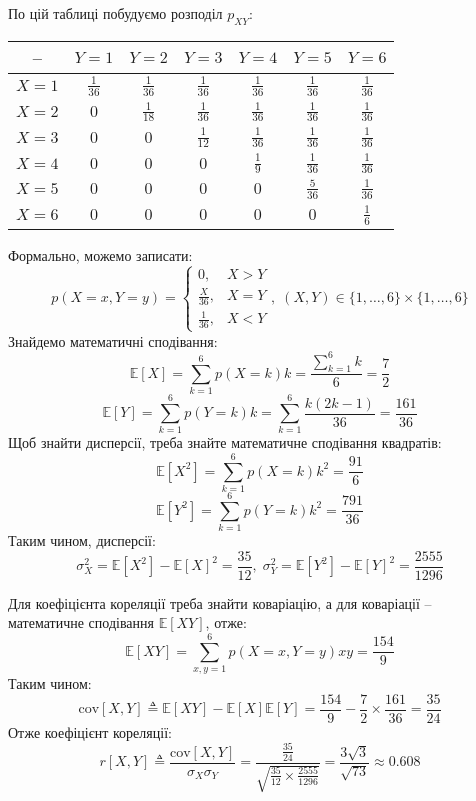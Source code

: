 \documentclass[14pt]{extarticle}
\begin{document}
По цій таблиці побудуємо розподіл $p_{XY}$:
\begin{center}
\begin{tabular}{ |c|c|c|c|c|c|c| } 
 \hline
 -- & $Y=1$ & $Y=2$ & $Y=3$ & $Y=4$ & $Y=5$ & $Y=6$ \\ 
 \hline
 $X=1$ & $\frac{1}{36}$ & $\frac{1}{36}$ & $\frac{1}{36}$ & $\frac{1}{36}$ & $\frac{1}{36}$ & $\frac{1}{36}$ \\ 
 \hline
 $X=2$ & $0$ & $\frac{1}{18}$ & $\frac{1}{36}$ & $\frac{1}{36}$ & $\frac{1}{36}$ & $\frac{1}{36}$ \\ 
 \hline
 $X=3$ & $0$ & $0$ & $\frac{1}{12}$ & $\frac{1}{36}$ & $\frac{1}{36}$ & $\frac{1}{36}$ \\
 \hline
 $X=4$ & $0$ & $0$ & $0$ & $\frac{1}{9}$ & $\frac{1}{36}$ & $\frac{1}{36}$ \\
 \hline
 $X=5$ & $0$ & $0$ & $0$ & $0$ & $\frac{5}{36}$ & $\frac{1}{36}$ \\
 \hline
 $X=6$ & $0$ & $0$ & $0$ & $0$ & $0$ & $\frac{1}{6}$ \\
 \hline
\end{tabular}
\end{center}
Формально, можемо записати:
\[
p(X=x,Y=y) = \begin{cases}
    0, & X > Y \\
    \frac{X}{36}, & X = Y \\ 
    \frac{1}{36}, & X < Y
\end{cases}, \; (X,Y) \in \{1,\dots,6\} \times \{1,\dots,6\}
\]
Знайдемо математичні сподівання:
\[
\mathbb{E}[X] = \sum_{k=1}^6 p(X=k)k = \frac{\sum_{k=1}^6 k}{6} = \frac{7}{2}
\]
\[
\mathbb{E}[Y] = \sum_{k=1}^6 p(Y=k)k = \sum_{k=1}^6 \frac{k(2k-1)}{36} = \frac{161}{36}
\]
Щоб знайти дисперсії, треба знайте математичне сподівання квадратів:
\[
\mathbb{E}[X^2] = \sum_{k=1}^6 p(X=k)k^2 = \frac{91}{6}
\]
\[
\mathbb{E}[Y^2] = \sum_{k=1}^6 p(Y=k)k^2 = \frac{791}{36}
\]
Таким чином, дисперсії:
\[
\sigma_X^2 = \mathbb{E}[X^2] - \mathbb{E}[X]^2 = \frac{35}{12}, \; \sigma_Y^2 = \mathbb{E}[Y^2] - \mathbb{E}[Y]^2 = \frac{2555}{1296}
\]

Для коефіцієнта кореляції треба знайти коваріацію, а для коваріації -- математичне сподівання $\mathbb{E}[XY]$, отже:
\[
\mathbb{E}[XY] = \sum_{x,y=1}^6 p(X=x,Y=y)xy = \frac{154}{9}
\]
Таким чином:
\[
\text{cov}[X,Y] \triangleq \mathbb{E}[XY] - \mathbb{E}[X]\mathbb{E}[Y] = \frac{154}{9} - \frac{7}{2} \times \frac{161}{36} = \frac{35}{24}
\]
Отже коефіцієнт кореляції:
\[
r[X,Y] \triangleq \frac{\text{cov}[X,Y]}{\sigma_X\sigma_Y} = \frac{\frac{35}{24}}{\sqrt{\frac{35}{12} \times \frac{2555}{1296}}} = \frac{3\sqrt{3}}{\sqrt{73}} \approx 0.608
\]
\end{document}
